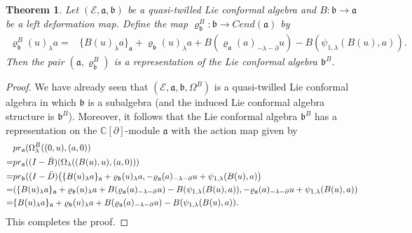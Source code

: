 \documentclass[a4paper,11pt]{article}
\def\Ep{\mathcal{E}}
\def\Vs{\mathfrak{a}}
\def\Ws{\mathfrak{b}}
\def\rep{\varrho}
\def\la{\lambda}
\def\p{\partial}
\numberwithin{equation}{section}
\newtheorem{theorem}{Theorem}[section]
\begin{document}
\begin{theorem}
Let $(\Ep,\Vs,\Ws)$ be a quasi-twilled Lie conformal algebra and $B: \Ws \to \Vs$ be a left deformation map. Define the map $\rep^B_\Ws: \Ws \to Cend(\Vs)$ by
\begin{align}
 \rep^B_\Ws(u)_\la a
  =& \{B(u)_\la a\}_\Vs + \rep_\Ws(u)_\la a +B(\rep_\Vs(a)_{-\la-\p}u)-B(\psi_{1,\la}(B(u),a)).
 \label{eq:induced-rep-II}    
\end{align}
Then the pair $(\Vs, \rep^B_\Ws)$ is a representation of the Lie conformal algebra $\Ws^B$. 
\end{theorem}

\begin{proof}
We have already seen that  $(\Ep,\Vs,\Ws,\Omega^B)$ is a quasi-twilled Lie conformal algebra in which $\Ws$ is a  subalgebra   (and the induced Lie conformal algebra structure is $\Ws^B$).     Moreover, it follows that
the Lie conformal  algebra $\Ws^B$ has a representation on the $\mathbb{C}[\partial]$-module $\Vs$ with the action map given by
\begin{align*}
&pr_{\Vs}(\Omega^B_\la((0,u),(a,0))\\=& pr_{\Vs}((I-\Bar{B})(\Omega_\la((B(u),u),(a,0))) \\
=&  pr_{\Ws}((I-\Bar{D}) \bigl(
\{B(u)_\la a\}_\Vs + \rep_\Ws(u)_\la a,
- \rep_\Vs(a)_{-\la-\p}u + \psi_{1,\la}(B(u),a)
\bigr)\\
=&(\{B(u)_\la a\}_\Vs + \rep_\Ws(u)_\la a +B(\rep_\Vs(a)_{-\la-\p}u)-B(\psi_{1,\la}(B(u),a)), - \rep_\Vs(a)_{-\la-\p}u + \psi_{1,\la}(B(u),a) )   \\
=&  \{B(u)_\la a\}_\Vs + \rep_\Ws(u)_\la a +B(\rep_\Vs(a)_{-\la-\p}u)-B(\psi_{1,\la}(B(u),a)).           
\end{align*}
This completes the proof. 
\end{proof}
\end{document}
